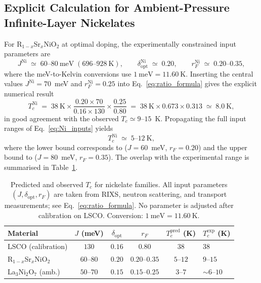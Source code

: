   \subsection{Explicit Calculation for Ambient-Pressure Infinite-Layer Nickelates}
    \label{subsec:explicit-calculation-for-ambient-pressure-infinite-layer-nickelates}

    For R$_{1-x}$Sr$_x$NiO$_2$ at optimal doping, the experimentally constrained input parameters are
    \begin{equation}
      J^\textrm{Ni} \;\simeq\; 60\text{--}80~\textrm{meV}
      \;(696\text{--}928~\textrm{K}), \qquad
      \delta^\textrm{Ni}_\textrm{opt} \;\simeq\; 0.20, \qquad
      r_F^\textrm{Ni} \;\simeq\; 0.20\text{--}0.35,
      \label{eq:Ni_inputs}
    \end{equation}
    where the meV-to-Kelvin conversions use $1~\textrm{meV} = 11.60~\textrm{K}$.
    Inserting the central values $J^\textrm{Ni} = 70$~meV and $r_F^\textrm{Ni} = 0.25$ into
    Eq.~\eqref{eq:ratio_formula} gives the explicit numerical result
    \begin{equation}
      T_c^\textrm{Ni} \;=\; 38~\textrm{K}
      \times \frac{0.20 \times 70}{0.16 \times 130}
      \times \frac{0.25}{0.80}
      \;=\; 38~\textrm{K} \times 0.673 \times 0.313
      \;\simeq\; 8.0~\textrm{K},
      \label{eq:Tc_Ni_central}
    \end{equation}
    in good agreement with the observed $T_c \simeq 9$--$15$~K.
    Propagating the full input ranges of Eq.~\eqref{eq:Ni_inputs} yields
    \begin{equation}
      T_c^\textrm{Ni} \;\simeq\; 5\text{--}12~\textrm{K},
      \label{eq:Tc_Ni_range}
    \end{equation}
    where the lower bound corresponds to ($J = 60$~meV, $r_F = 0.20$) and the upper bound to
    ($J = 80$~meV, $r_F = 0.35$).
    The overlap with the experimental range is summarised in Table~\ref{tab:Tc_compare}.

    \begin{table}[h]
      \centering
      \caption{Predicted and observed $T_c$ for nickelate families.
      All input parameters $(J, \delta_\textrm{opt}, r_F)$ are taken from RIXS, neutron scattering,
        and transport measurements; see Eq.~\eqref{eq:ratio_formula}.
        No parameter is adjusted after calibration on LSCO.
        Conversion: $1~\textrm{meV} = 11.60~\textrm{K}$.}
      \label{tab:Tc_compare}
      \begin{tabular}{lccccl}
        \hline
        Material & $J$ (meV) & $\delta_\textrm{opt}$ & $r_F$ &
        $T_c^\textrm{pred}$ (K) & $T_c^\textrm{exp}$ (K) \\
        \hline
        LSCO (calibration)       & $130$      & $0.16$ & $0.80$         & $38$      & $38$           \\
        R$_{1-x}$Sr$_x$NiO$_2$   & $60$--$80$ & $0.20$ & $0.20$--$0.35$ & $5$--$12$ & $9$--$15$      \\
        La$_3$Ni$_2$O$_7$ (amb.) & $50$--$70$ & $0.15$ & $0.15$--$0.25$ & $3$--$7$  & $\sim 6$--$10$ \\
        \hline
      \end{tabular}
    \end{table}

